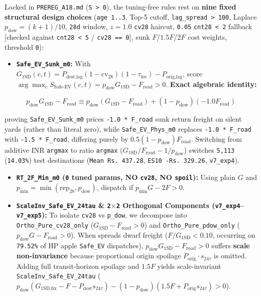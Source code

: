 \documentclass[11pt,a4paper]{article}
\begin{document}
Locked in \texttt{PREREG\_A18.md} (\texttt{S > 0}), the tuning-free rules rest on \textbf{nine fixed structural design choices} (\texttt{age 1..3}, Top-5 cutoff, \texttt{lag\_spread > 100}, Laplace $p_{\text{dow}} = (k+1)/10$, \texttt{28d} window, $z = 1.0$ \texttt{cv28} haircut, \texttt{0.05} \texttt{cnt28 < 2} fallback [checked against \texttt{cnt28 < 5} / \texttt{cv28 == 0}], sunk $F$/$1.5F$/$2F$ cost weights, threshold \texttt{0}):

\begin{itemize}
  \item \textbf{\texttt{Safe\_EV\_Sunk\_m0}:} With $G_{\text{1SD}}(c, t) = P_{\text{dest,lag}}(1 - \text{cv}_{28})(1 - \tau_{\text{fee}}) - P_{\text{orig,lag}}$, score $\arg\max_{c} S_{\text{Safe-EV}}(c,t) = p_{\text{dow}} G_{\text{1SD}} - F_{\text{road}} > 0$. \textbf{Exact algebraic identity:}
\end{itemize}

\begin{equation}
p_{\text{dow}} G_{\text{1SD}} - F_{\text{road}} \equiv p_{\text{dow}}(G_{\text{1SD}} - F_{\text{road}}) + (1 - p_{\text{dow}})(-1.0 F_{\text{road}})
\end{equation}

proving \texttt{Safe\_EV\_Sunk\_m0} prices \texttt{-1.0 * F\_road} sunk return freight on silent yards (rather than literal zero), while \texttt{Safe\_EV\_Phys\_m0} replaces \texttt{-1.0 * F\_road} with \texttt{-1.5 * F\_road}, differing purely by $0.5(1 - p_{\text{dow}})F_{\text{road}}$. Switching from additive INR \texttt{argmax} to ratio \texttt{argmax} ($G_{\text{1SD}}/F_{\text{road}} - 1/p_{\text{dow}}$) switches \texttt{5,113} (\texttt{14.03\%}) test destinations (\texttt{Mean Rs.\,437.28}, \texttt{ES10 -Rs.\,329.26}, \texttt{v7\_exp4}).

\begin{itemize}
  \item \textbf{\texttt{RT\_2F\_Min\_m0} (\texttt{0} tuned params, NO \texttt{cv28}, NO \texttt{spoil}):} Using plain $G$ and $p_{\min} = \min(\text{rep}_{28}, p_{\text{dow}})$, dispatch if $p_{\min} G - 2F > 0$.
  \item \textbf{\texttt{ScaleInv\_Safe\_EV\_24tau} \& \texttt{2$\times$2} Orthogonal Components (\texttt{v7\_exp4}--\texttt{v7\_exp5}):} To isolate \texttt{cv28} vs \texttt{p\_dow}, we decompose into \texttt{Ortho\_Pure\_cv28\_only} ($G_{\text{1SD}} - F_{\text{road}} > 0$) and \texttt{Ortho\_Pure\_pdow\_only} ($p_{\text{dow}} G - F_{\text{road}} > 0$). When spreads dwarf freight ($F / G_{\text{1SD}} < 0.10$, occurring on \texttt{79.52\%} of HP apple \texttt{Safe\_EV} dispatches), $p_{\text{dow}} G_{\text{1SD}} - F_{\text{road}} > 0$ suffers \textbf{scale non-invariance} because proportional origin spoilage $P_{\text{orig}} \cdot s_{24\tau}$ is omitted. Adding full transit-horizon spoilage and $1.5 F$ yields scale-invariant \texttt{ScaleInv\_Safe\_EV\_24tau} ($p_{\text{dow}}(G_{\text{1SD,fix}} - F - P_{\text{dest}} s_{24\tau}) - (1-p_{\text{dow}})(1.5F + P_{\text{orig}} s_{24\tau}) > 0$).
\end{itemize}
\end{document}
